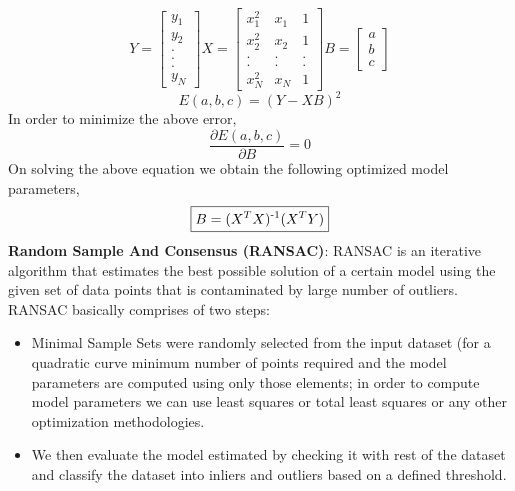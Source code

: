 \documentclass{article}
\begin{document}
\begin{equation}
\boxed{Y = 
\begin{bmatrix}
y_1 \\ y_2 \\ . \\ . \\ . \\ y_N
\end{bmatrix}
X = 
\begin{bmatrix}
x^2_1 & x_1 & 1 \\ x^2_2 & x_2 & 1 \\ . & . & . \\ . & . & . \\
x^2_N & x_N & 1 
\end{bmatrix}
B = 
\begin{bmatrix}
a \\ b \\ c
\end{bmatrix}}
\end{equation}
\begin{equation}
\boxed{E(a, b, c) = (Y - XB)^2}
\end{equation}
In order to minimize the above error,
\begin{equation}
\boxed{\frac{\partial E(a, b, c)}{\partial B} = 0}
\end{equation}
On solving the above equation we obtain the following optimized model parameters,
\begin{equation}
\boxed{B = (X^TX)\textsuperscript{-1}(X^TY)}
\end{equation}
\newline \textbf{Random Sample And Consensus (RANSAC)}:
\newline
RANSAC is an iterative algorithm that estimates the best possible solution of a certain model using the given set of data points that is contaminated by large number of outliers. RANSAC basically comprises of two steps:
\begin{itemize}
    \item Minimal Sample Sets were randomly selected from the input dataset (for a quadratic curve minimum number of points required and the model parameters are computed using only those elements; in order to compute model parameters we can use least squares or total least squares or any other optimization methodologies.
    \item We then evaluate the model estimated by checking it with rest of the dataset and classify the dataset into inliers and outliers based on a defined threshold.
\end{itemize}
\end{document}
